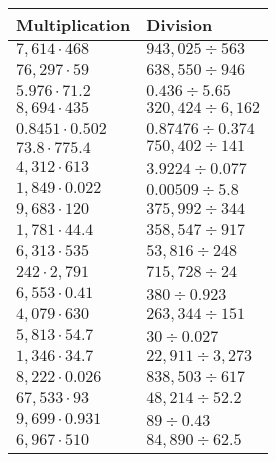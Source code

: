 \begin{longtable}[]{@{}ll@{}}
\toprule
Multiplication & Division\tabularnewline
\midrule
\endhead
\(7,614\cdot468\) & \(943,025÷563\)\tabularnewline
\(76,297\cdot59\) & \(638,550÷946\)\tabularnewline
\(5.976\cdot71.2\) & \(0.436÷5.65\)\tabularnewline
\(8,694\cdot435\) & \(320,424÷6,162\)\tabularnewline
\(0.8451\cdot0.502\) & \(0.87476÷0.374\)\tabularnewline
\(73.8\cdot775.4\) & \(750,402÷141\)\tabularnewline
\(4,312\cdot613\) & \(3.9224÷0.077\)\tabularnewline
\(1,849\cdot0.022\) & \(0.00509 ÷5.8\)\tabularnewline
\(9,683\cdot120\) & \(375,992÷344\)\tabularnewline
\(1,781\cdot44.4\) & \(358,547÷917\)\tabularnewline
\(6,313\cdot535\) & \(53,816÷248\)\tabularnewline
\(242\cdot2,791\) & \(715,728÷24\)\tabularnewline
\(6,553\cdot0.41\) & \(380÷0.923\)\tabularnewline
\(4,079\cdot630\) & \(263,344÷151\)\tabularnewline
\(5,813\cdot54.7\) & \(30÷0.027\)\tabularnewline
\(1,346\cdot34.7\) & \(22,911÷3,273\)\tabularnewline
\(8,222\cdot0.026\) & \(838,503÷617\)\tabularnewline
\(67,533\cdot93\) & \(48,214÷52.2\)\tabularnewline
\(9,699\cdot0.931\) & \(89÷0.43\)\tabularnewline
\(6,967\cdot510\) & \(84,890÷62.5\)\tabularnewline
\bottomrule
\end{longtable}
